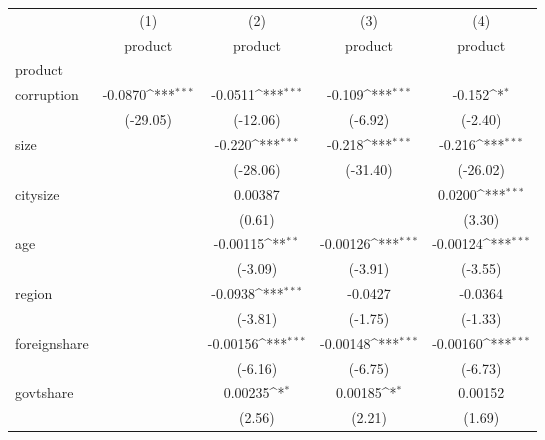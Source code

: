 {
\def\sym#1{\ifmmode^{#1}\else\(^{#1}\)\fi}
\begin{tabular}{l*{4}{c}}
\hline\hline
            &\multicolumn{1}{c}{(1)}&\multicolumn{1}{c}{(2)}&\multicolumn{1}{c}{(3)}&\multicolumn{1}{c}{(4)}\\
            &\multicolumn{1}{c}{product}&\multicolumn{1}{c}{product}&\multicolumn{1}{c}{product}&\multicolumn{1}{c}{product}\\
\hline
product     &                     &                     &                     &                     \\
corruption  &     -0.0870\sym{***}&     -0.0511\sym{***}&      -0.109\sym{***}&      -0.152\sym{*}  \\
            &    (-29.05)         &    (-12.06)         &     (-6.92)         &     (-2.40)         \\
[1em]
size        &                     &      -0.220\sym{***}&      -0.218\sym{***}&      -0.216\sym{***}\\
            &                     &    (-28.06)         &    (-31.40)         &    (-26.02)         \\
[1em]
citysize    &                     &     0.00387         &                     &      0.0200\sym{***}\\
            &                     &      (0.61)         &                     &      (3.30)         \\
[1em]
age         &                     &    -0.00115\sym{**} &    -0.00126\sym{***}&    -0.00124\sym{***}\\
            &                     &     (-3.09)         &     (-3.91)         &     (-3.55)         \\
[1em]
region      &                     &     -0.0938\sym{***}&     -0.0427         &     -0.0364         \\
            &                     &     (-3.81)         &     (-1.75)         &     (-1.33)         \\
[1em]
foreignshare&                     &    -0.00156\sym{***}&    -0.00148\sym{***}&    -0.00160\sym{***}\\
            &                     &     (-6.16)         &     (-6.75)         &     (-6.73)         \\
[1em]
govtshare   &                     &     0.00235\sym{*}  &     0.00185\sym{*}  &     0.00152         \\
            &                     &      (2.56)         &      (2.21)         &      (1.69)         \\

\end{tabular}}
